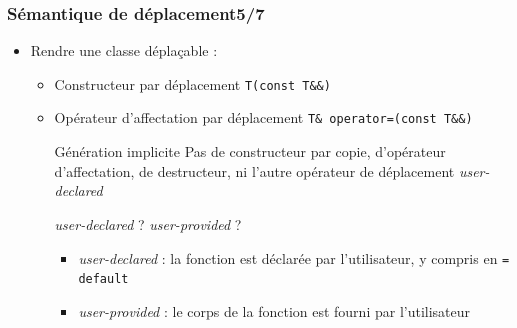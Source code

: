 \documentclass[C++.tex]{subfiles}
\begin{document}
\begin{frame}
	\frametitle{Sémantique de déplacement\titlehfill{}5/7}
	\begin{itemize}
		\item Rendre une classe déplaçable :
		\begin{itemize}
			\item Constructeur par déplacement \lstinline|T(const T&&)|
			\item Opérateur d'affectation par déplacement \lstinline|T& operator=(const T&&)|

			\begin{block}{Génération implicite}
				Pas de constructeur par copie, d'opérateur d'affectation, de destructeur, ni l'autre \og opérateur\fg{} de déplacement \textit{user-declared}
			\end{block}
		
			\begin{alertblock}{\textit{user-declared} ? \textit{user-provided} ?}
				\begin{itemize}
					\item \textit{user-declared} : la fonction est déclarée par l'utilisateur, y compris en \lstinline|= default| 
					\item \textit{user-provided} : le corps de la fonction est fourni par l'utilisateur

				\end{itemize}
			\end{alertblock}
		\end{itemize}
	\end{itemize}
\end{frame}
\end{document}

